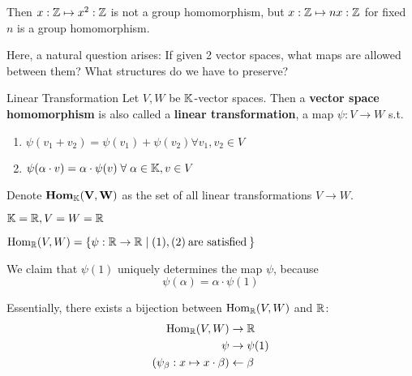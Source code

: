 Then \(x:\mathbb{Z} \mapsto x^2:\mathbb{Z}\) is not a group homomorphism, but \(x: \mathbb{Z} \mapsto nx: \mathbb{Z}\) for fixed \(n\) is a group homomorphism.

Here, a natural question arises: If given 2 vector spaces, what maps are allowed between them? What structures do we have to preserve?

\begin{definition} {Linear Transformation}
    Let \(V, W\) be \(\mathbb{K}\)-vector spaces. Then a \textbf{vector space homomorphism} is also called a \textbf{linear transformation}, a map \(\psi: V \to W\) s.t.
    \begin{enumerate}
        \item \(\psi(v_1 + v_2) = \psi(v_1) + \psi(v_2) \forall v_1, v_2 \in V\)
        \item \(\psi(\alpha \cdot v) = \alpha \cdot \psi(v) \forall \alpha \in \bbk, v \in V\)
    \end{enumerate}

    Denote \(\mathbf{Hom_{\mathbb{K}}(V, W)}\) as the set of all linear transformations \(V \to W\).
\end{definition}

\begin{example}
    \(\mathbb{K} = \mathbb{R}, V = W = \mathbb{R}\)

    \(\mathrm{Hom}_{\mathbb{R}}(V, W) = \{\psi: \mathbb{R} \to \mathbb{R} \mid (1), (2) \:\text{are satisfied}\: \} \)

    We claim that \(\psi(1)\) uniquely determines the map \(\psi\), because \[
        \psi(\alpha) = \alpha \cdot \psi(1)
    \]

    Essentially, there exists a bijection between \(\mathrm{Hom}_{\mathbb{R}}(V, W)\) and \(\mathbb{R}\):
    \begin{align*}
        \mathrm{Hom}_{\mathbb{R}}(V, W)              & \to \mathbb{R}         \\
        \psi                                 & \to \psi(1)      \\
        (\psi_\beta: x \mapsto x \cdot\beta) & \leftarrow \beta
    \end{align*}
\end{example}


